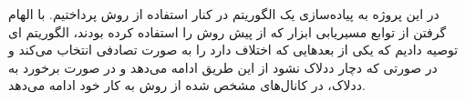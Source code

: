 

در این پروژه به پیاده‌سازی یک الگوریتم  در کنار استفاده از روش  پرداختیم. با الهام گرفتن از توابع مسیریابی ابزار  که از پیش روش  را استفاده کرده بودند، الگوریتم  ای توصیه دادیم که یکی از بعد‌هایی که اختلاف دارد را به صورت تصادفی انتخاب می‌کند و در صورتی که دچار ددلاک نشود از این طریق ادامه می‌دهد و در صورت برخورد به ددلاک، در کانال‌های مشخص شده از روش  به کار خود ادامه می‌دهد.